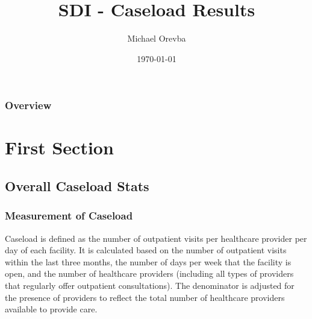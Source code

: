\documentclass{beamer}
\title[Caseload Analysis]{SDI - Caseload Results} %
\author{Michael Orevba} %
\institute[The World Bank] %
{
	The World Bank Group \\ %
	\medskip
}
\date{\today} %
\begin{document}
	
	\begin{frame}
		\titlepage %
	\end{frame}
	
	\begin{frame}
		\frametitle{Overview} %
		\tableofcontents %
	\end{frame}
	
	
	\section{First Section} %
	
	\subsection{Overall Caseload Stats} %


	
	\begin{frame}
		\frametitle{Measurement of Caseload}
		Caseload is defined as the number of outpatient visits per healthcare provider per day of each facility. It is calculated based on the number of outpatient visits within the last three months, the number of days per week that the facility is open, and the number of healthcare providers (including all types of providers that regularly offer outpatient consultations). The denominator is adjusted for the presence of providers to reflect the total number of healthcare providers available to provide care.
		
	\end{frame}
	
\end{document}
